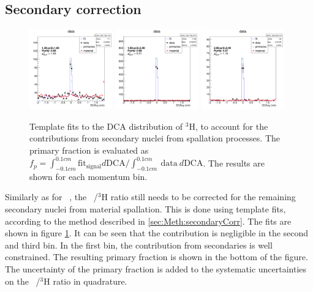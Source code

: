 \subsection{Secondary correction}
\begin{figure}
    \centering
    \includegraphics[width=0.32\textwidth]{figures/triton/Templates/TemplateFitHe3_1.3<p<1.6_rebin_2_Bin_1.png}
    \includegraphics[width=0.32\textwidth]{figures/triton/Templates/TemplateFitHe3_1.6<p<2_rebin_2_Bin_2.png}
    \includegraphics[width=0.32\textwidth]{figures/triton/Templates/TemplateFitHe3_2<p<2.4_rebin_2_Bin_3.png}
    \caption{Template fits to the DCA distribution of $^3\mathrm{H}$, to account for the contributions from secondary nuclei from spallation processes. The primary fraction is evaluated as $f_p = \int_{-0.1cm}^{0.1cm} \mathrm{fit}_{\mathrm{signal}} d\mathrm{DCA} / \int_{-0.1cm}^{0.1cm}\ \mathrm{data}\ d\mathrm{DCA}$. The results are shown for each momentum bin.}%
    \label{fig:TemplateFitsTriton}
\end{figure}
Similarly as for \ahe\ , the \atrit\ /$^3\mathrm{H}$ ratio still needs to be corrected for the remaining secondary nuclei from material spallation. This is done using template fits, according to the method described in \ref{sec:Meth:secondaryCorr}. The fits are shown in figure \ref{fig:TemplateFitsTriton}. It can be seen that the contribution is negligible in the second and third bin. In the first bin, the contribution from secondaries is well constrained. The resulting primary fraction is shown in the bottom of the figure. The uncertainty of the primary fraction is added to the systematic uncertainties on the \atrit\ /$^3\mathrm{H}$ ratio in quadrature.


